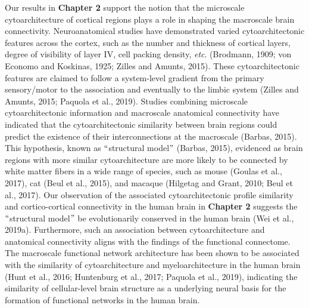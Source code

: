 \begin{refsection}
Our results in \textbf{Chapter 2} support the notion that the microscale cytoarchitecture of cortical regions plays a role in shaping the macroscale brain connectivity. Neuroanatomical studies have demonstrated varied cytoarchitectonic features across the cortex, such as the number and thickness of cortical layers, degree of visibility of layer IV, cell packing density, \textit{etc}. (Brodmann, 1909; von Economo and Koskinas, 1925; Zilles and Amunts, 2015). These cytoarchitectonic features are claimed to follow a system-level gradient from the primary sensory/motor to the association and eventually to the limbic system (Zilles and Amunts, 2015; Paquola et al., 2019). Studies combining microscale cytoarchitectonic information and macroscale anatomical connectivity have indicated that the cytoarchitectonic similarity between brain regions could predict the existence of their interconnections at the macroscale (Barbas, 2015). This hypothesis, known as $``$structural model$"$  (Barbas, 2015), evidenced as brain regions with more similar cytoarchitecture are more likely to be connected by white matter fibers in a wide range of species, such as mouse (Goulas et al., 2017), cat (Beul et al., 2015), and macaque (Hilgetag and Grant, 2010; Beul et al., 2017). Our observation of the associated cytoarchitectonic profile similarity and cortico-cortical connectivity in the human brain in \textbf{Chapter 2} suggests the $``$structural model$"$  be evolutionarily conserved in the human brain (Wei et al., 2019a). Furthermore, such an association between cytoarchitecture and anatomical connectivity aligns with the findings of the functional connectome. The macroscale functional network architecture has been shown to be associated with the similarity of cytoarchitecture and myeloarchitecture in the human brain (Hunt et al., 2016; Huntenburg et al., 2017; Paquola et al., 2019), indicating the similarity of cellular-level brain structure as a underlying neural basis for the formation of functional networks in the human brain.


\end{refsection}
